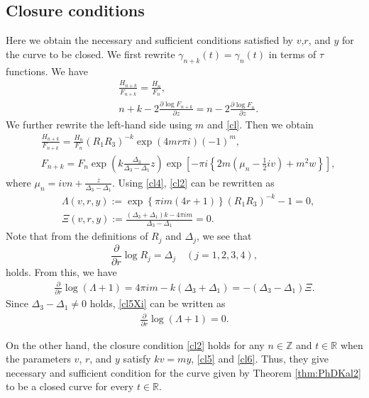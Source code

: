 \documentclass[10pt,leqno]{amsart}
\newcommand{\R}{\mathbb{R}}
\numberwithin{equation}{section}
\begin{document}
\subsection{Closure conditions}\label{subsection:Closure conditions}
Here we obtain the necessary and sufficient conditions satisfied by $v$,$r$, and $y$ for the curve to be closed.
We first rewrite $\gamma_{n+k}(t)=\gamma_n(t)$ in terms of $\tau$ functions. We have
\begin{align}\label{cl2}
&\frac{H_{n+k}}{F_{n+k}}=\frac{H_{n}}{F_{n}},\\
& n+k-2\displaystyle\frac{\partial\log F_{n+k}}{\partial z}=n-2\displaystyle\frac{\partial\log F_{n}}{\partial z}. \nonumber
\end{align} 
We further rewrite the left-hand side using $m$ and \eqref{cl}. Then we obtain
\begin{align}\label{cl4}
&\frac{H_{n+k}}{F_{n+k}}=\frac{H_{n}}{F_{n}}\left(R_{1}R_{3}\right)^{-k}\exp\left(4mr\pi i\right)(-1)^{m},\\
&F_{n+k}=F_{n}\exp\left(k\frac{\Delta_{3}}{\Delta_{3}-\Delta_{1}}z\right)\exp\left[-\pi i\left\{2m\left(\mu_{n}-\frac{1}{2}iv\right)+m^{2}w\right\}\right],\nonumber
\end{align}
where $\mu_{n}=ivn+\frac{z}{\Delta_{3}-\Delta_{1}}$. 
Using \eqref{cl4}, \eqref{cl2} can be rewritten as
\begin{align}\label{cl5}
&\Lambda(v, r, y):=\exp\left\{\pi im\left(4r+1\right)\right\}\left(R_{1}R_{3}\right)^{-k}-1=0, \\
&\Xi(v, r, y):=\frac{\left(\Delta_{3}+\Delta_{1}\right)k-4\pi im}{\Delta_{3}-\Delta_{1}}=0.\label{cl5Xi}
\end{align}
Note that from the definitions of $R_j$ and $\Delta_{j}$, we see that
\begin{equation} 
 \frac{\partial}{\partial r}\log R_j=\Delta_{j} \quad(j=1,2,3,4),
\end{equation}
holds.
From this, we have 
\begin{align}\label{perio6} 
\frac{\partial}{\partial r}\log (\Lambda + 1) =4\pi im-k\left(\Delta_{3}+\Delta_{1}\right)= -\left(\Delta_{3 }-\Delta_{1}\right)\Xi.
\end{align} 
Since $\Delta_{3}-\Delta_{1}\neq 0$ holds, \eqref{cl5Xi} can be written as
\begin{align}
\frac{\partial}{\partial r}\log (\Lambda + 1)=0.\label{cl6}
\end{align}

On the other hand, the closure condition \eqref{cl2} holds for any $n\in\mathbb{Z}$ and $t\in\R$ when the parameters $v$, $r$, and $y$ satisfy $kv=my$, \eqref{cl5} and \eqref{cl6}. Thus, they give necessary and sufficient condition for the curve given by Theorem \ref{thm:PhDKal2} to be a closed curve for every $t\in\R$.
\end{document}
